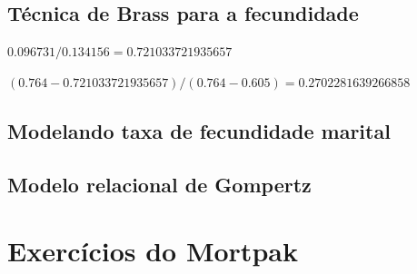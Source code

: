 \documentclass[
  12pt,
  a4paper,
]{scrreprt}
\begin{document}
\section{Técnica de Brass para a
fecundidade}\label{tuxe9cnica-de-brass-para-a-fecundidade}

\(0.096731 / 0.134156 = 0.721033721935657\)

\((0.764 - 0.721033721935657) / (0.764 - 0.605) = 0.2702281639266858\)

\section{Modelando taxa de fecundidade
marital}\label{modelando-taxa-de-fecundidade-marital-1}

\section{Modelo relacional de
Gompertz}\label{modelo-relacional-de-gompertz-1}

\chapter{Exercícios do Mortpak}\label{exercuxedcios-do-mortpak}
\end{document}
